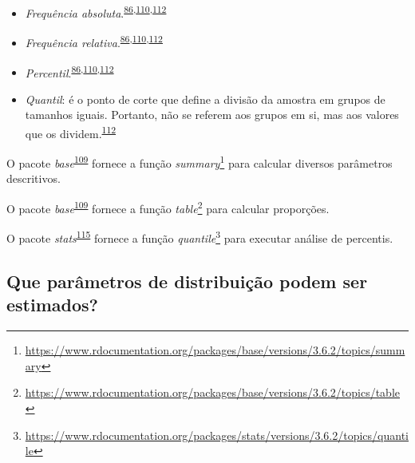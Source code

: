 \documentclass[
  a4paper,
]{book}
\renewcommand{\href}[2]{#2\footnote{\url{#1}}}
\newenvironment{infobox}[1]
  {
  \begin{itemize}
  \renewcommand{\labelitemi}{
    \raisebox{-.7\height}[0pt][0pt]{
      {\setkeys{Gin}{width=3em,keepaspectratio}
        \texttt{[image: \#1]}}
    }
  }
  \setlength{\fboxsep}{1em}
  \begin{blackbox}
  \item
  }
  {
  \end{blackbox}
  \end{itemize}
  }
\begin{document}
\begin{itemize}
\item
  \emph{Frequência absoluta}.\textsuperscript{\protect\hyperlink{ref-Ali2016}{86},\protect\hyperlink{ref-kanji2006}{110},\protect\hyperlink{ref-Altman1994}{112}}
\item
  \emph{Frequência relativa}.\textsuperscript{\protect\hyperlink{ref-Ali2016}{86},\protect\hyperlink{ref-kanji2006}{110},\protect\hyperlink{ref-Altman1994}{112}}
\item
  \emph{Percentil}.\textsuperscript{\protect\hyperlink{ref-Ali2016}{86},\protect\hyperlink{ref-kanji2006}{110},\protect\hyperlink{ref-Altman1994}{112}}
\item
  \emph{Quantil}: é o ponto de corte que define a divisão da amostra em grupos de tamanhos iguais. Portanto, não se referem aos grupos em si, mas aos valores que os dividem.\textsuperscript{\protect\hyperlink{ref-Altman1994}{112}}
\end{itemize}

\begin{infobox}{images/Rlogo}
O pacote \emph{base}\textsuperscript{\protect\hyperlink{ref-base-6}{109}} fornece a função \href{https://www.rdocumentation.org/packages/base/versions/3.6.2/topics/summary}{\emph{summary}} para calcular diversos parâmetros descritivos.

\end{infobox}

\begin{infobox}{images/Rlogo}
O pacote \emph{base}\textsuperscript{\protect\hyperlink{ref-base-6}{109}} fornece a função \href{https://www.rdocumentation.org/packages/base/versions/3.6.2/topics/table}{\emph{table}} para calcular proporções.

\end{infobox}

\begin{infobox}{images/Rlogo}
O pacote \emph{stats}\textsuperscript{\protect\hyperlink{ref-base}{115}} fornece a função \href{https://www.rdocumentation.org/packages/stats/versions/3.6.2/topics/quantile}{\emph{quantile}} para executar análise de percentis.

\end{infobox}

\hypertarget{que-paruxe2metros-de-distribuiuxe7uxe3o-podem-ser-estimados}{%
\subsection{Que parâmetros de distribuição podem ser estimados?}\label{que-paruxe2metros-de-distribuiuxe7uxe3o-podem-ser-estimados}}
\end{document}
